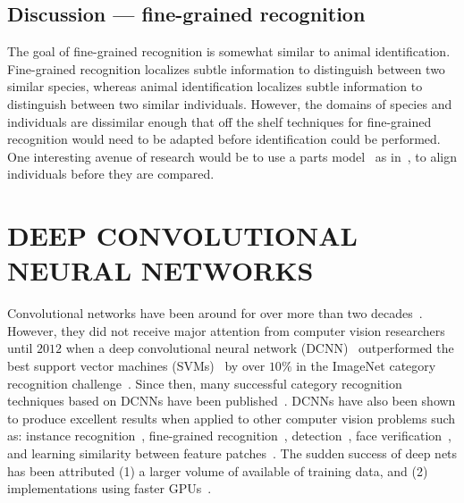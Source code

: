     \subsection{Discussion --- fine-grained recognition}
        The goal of fine-grained recognition is somewhat similar to animal identification. Fine-grained recognition
        localizes subtle information to distinguish between two similar species, whereas animal identification
        localizes subtle information to distinguish between two similar individuals. However, the domains of
        species and individuals are dissimilar enough that off the shelf techniques for fine-grained recognition
        would need to be adapted before identification could be performed. One interesting avenue of research would
        be to use a parts model~\cite{felzenszwalb_object_2010} as in~\cite{gavves_local_2014}, to align
        individuals before they are compared.


\section{DEEP CONVOLUTIONAL NEURAL NETWORKS}\label{sec:dcnn}
    Convolutional networks have been around for over more than two decades~\cite{lecun_gradient_based_1998,
    fukushima_neocognitron_1988}. However, they did not receive major attention from computer vision researchers
    until $2012$ when a deep convolutional neural network (DCNN)~\cite{krizhevsky_imagenet_2012} outperformed the
    best support vector machines (SVMs)~\cite{vapnik_statistical_1998} by over $10\percent$ in the ImageNet
    category recognition challenge~\cite{russakovsky_imagenet_2015}. Since then, many successful category
    recognition techniques based on DCNNs have been published~\cite{simonyan_very_2015, chatfield_efficient_2014,
    chatfield_return_2014, oquab_learning_2014, szegedy_going_2015, long_convnets_2014, he_spatial_2014,
    dean_fast_2013}. DCNNs have also been shown to produce excellent results when applied to other computer vision
    problems such as: %
    instance recognition~\cite{razavian_cnn_2014, razavian_baseline_2015, liu_learning_2015,
    held_deep_2015,arandjelovic_netvlad_2016,radenovic_cnn_2016}, %
    fine-grained recognition~\cite{branson_bird_2014, donahue_decaf_2014, catherine_wah_similarity_2014}, %
    detection~\cite{girshick_rich_2014, sermanet_overfeat_2013, li_wan_end_end_2015}, %
    face verification~\cite{huang_learning_2012, taigman_deepface_2014, sun_deep_2013}, %
    and learning similarity between feature patches~\cite{osendorfer_convolutional_2013, han_matchnet_2015,
    ng_exploiting_2015, zagoruyko_learning_2015, han_matchnet_2015}. The sudden success of deep nets has been
    attributed (1) a larger volume of available of training data, and (2) implementations using faster
    GPUs~\cite{krizhevsky_imagenet_2012}.
      
